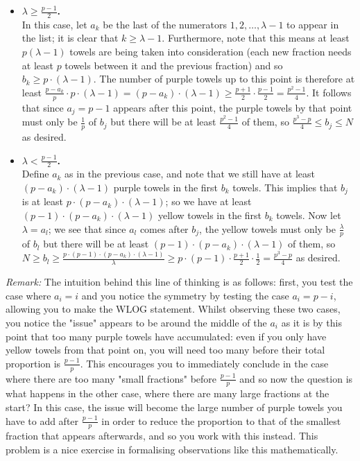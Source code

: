 \begin{itemize}
    \item \textbf{$\lambda \ge \frac{p-1}{2}$.}\\
    In this case, let $a_k$ be the last of the numerators $1, 2, \dots, \lambda-1$ to appear in the list; it is clear that $k \ge \lambda-1$. Furthermore, note that this means at least $p(\lambda-1)$ towels are being taken into consideration (each new fraction needs at least $p$ towels between it and the previous fraction) and so $b_k \ge p \cdot (\lambda-1)$. The number of purple towels up to this point is therefore at least $\frac{p-a_k}{p} \cdot p \cdot (\lambda-1) = (p-a_k) \cdot (\lambda-1) \ge \frac{p+1}{2} \cdot \frac{p-1}{2} = \frac{p^2-1}{4}$. It follows that since $a_j  = p-1$ appears after this point, the purple towels by that point must only be $\frac{1}{p}$ of $b_j$ but there will be at least $\frac{p^2-1}{4}$ of them, so $\frac{p^3-p}{4} \le b_j \le N$ as desired. 
    \item \textbf{$\lambda < \frac{p-1}{2}$.}\\
    Define $a_k$ as in the previous case, and note that we still have at least $(p-a_k) \cdot (\lambda-1)$ purple towels in the first $b_k$ towels. This implies that $b_j$ is at least $p \cdot (p-a_k) \cdot (\lambda-1)$; so we have at least $(p-1) \cdot (p-a_k) \cdot (\lambda-1)$ yellow towels in the first $b_k$ towels. Now let $\lambda = a_l$; we see that since $a_l$ comes after $b_j$, the yellow towels must only be $\frac{\lambda}{p}$ of $b_l$ but there will be at least $(p-1) \cdot (p-a_k) \cdot (\lambda-1)$ of them, so $N \ge b_l \ge \frac{p \cdot (p-1) \cdot (p-a_k) \cdot (\lambda-1)}{\lambda} \ge p \cdot (p-1) \cdot \frac{p+1}{2} \cdot \frac{1}{2} = \frac{p^3-p}{4}$ as desired. \\
    \bigskip
\end{itemize}    
\emph{Remark:} The intuition behind this line of thinking is as follows: first, you test the case where $a_i = i$ and you notice the symmetry by testing the case $a_i = p-i$, allowing you to make the WLOG statement. Whilst observing these two cases, you notice the "issue" appears to be around the middle of the $a_i$ as it is by this point that too many purple towels have accumulated: even if you only have yellow towels from that point on, you will need too many before their total proportion is $\frac{p-1}{p}$. This encourages you to immediately conclude in the case where there are too many "small fractions" before $\frac{p-1}{p}$ and so now the question is what happens in the other case, where there are many large fractions at the start? In this case, the issue will become the large number of purple towels you have to add after $\frac{p-1}{p}$ in order to reduce the proportion to that of the smallest fraction that appears afterwards, and so you work with this instead. This problem is a nice exercise in formalising observations like this mathematically. 

